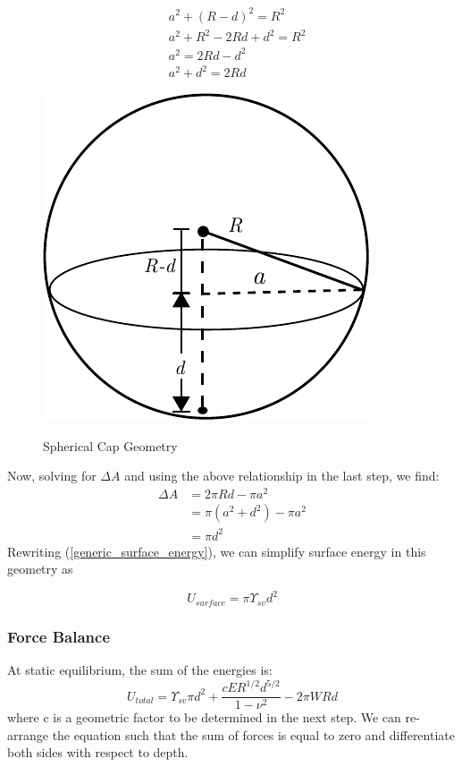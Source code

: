 \begin{figure}
	\begin{minipage}{.5\textwidth}
	\begin{align*}
	&a^2 + (R-d)^2 = R^2 \\
	&a^2 + R^2 - 2Rd +d^2 = R^2 \\
	&a^2 = 2Rd -d^2 \\
	&a^2 + d^2 = 2Rd
	\end{align*}
	\end{minipage}%
	\begin{minipage}{.5\textwidth}
	\centering
	\caption{Spherical Cap Geometry}
	\includegraphics[width=.5\linewidth]{Chapters/Figures/SphericalCap}
	\label{fig:sphericalcap}
	\end{minipage}
\end{figure}
\noindent Now, solving for $ \Delta A $ and using the above relationship in the last step, we find:
\begin{align*}
\Delta A &= 2\pi Rd - \pi a^2 \\
&= \pi(a^2+d^2) - \pi a^2 \\
&= \pi d^2
\end{align*}
 Rewriting (\ref{generic_surface_energy}), we can simplify surface energy in this geometry as 
 
 \begin{equation}
 \label{surface_energy}
 U_{surface} = \pi \Upsilon_{sv} d^2
 \end{equation}

\subsubsection{Force Balance}
At static equilibrium, the sum of the energies is:
\[U_{total} = \Upsilon_{sv} \pi d^2 + \frac{cER^{1/2}d^{5/2}}{1-\nu^2} - 2\pi W R d\] 
where c is a geometric factor to be determined in the next step. We can re-arrange the equation such that the sum of forces is equal to zero and differentiate both sides with respect to depth.

